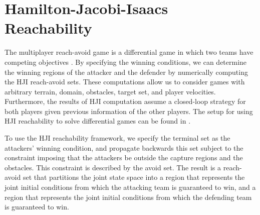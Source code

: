 \section{Hamilton-Jacobi-Isaacs Reachability} \label{sec:hj_background}
The multiplayer reach-avoid game is a differential game in which two teams have competing objectives \cite{b:basar-olsder-1999}. By specifying the winning conditions, we can determine the winning regions of the attacker and the defender by numerically computing the HJI reach-avoid sets. These computations allow us to consider games with arbitrary terrain, domain, obstacles, target set, and player velocities. Furthermore, the results of HJI computation assume a closed-loop strategy for both players given previous information of the other players. The setup for using HJI reachability to solve differential games can be found in \cite{Huang2011, j:mitchell-TAC-2005, Chen2014, LSToolbox}. %
%
%

To use the HJI reachability framework, we specify the terminal set as the attackers' winning condition, and propagate backwards this set subject to the constraint imposing that the attackers be outside the capture regions and the obstacles. This constraint is described by the avoid set. The result is a reach-avoid set that partitions the joint state space into a region that represents the joint initial conditions from which the attacking team is guaranteed to win, and a region that represents the joint initial conditions from which the defending team is guaranteed to win.

